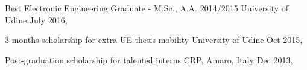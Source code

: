 \vspace{-2mm}




\begin{cvhonors}

	\cvhonor
	{}
	{Best Electronic Engineering Graduate - M.Sc., A.A. 2014/2015}
	{University of Udine}
	{July 2016,}

	\cvhonor
	{}
	{3 months scholarship for extra UE thesis mobility}
	{University of Udine}
	{Oct 2015,}

	\cvhonor
	{}
	{Post-graduation scholarship for talented interns}
	{CRP, Amaro, Italy}
	{Dec 2013,}

\end{cvhonors}

